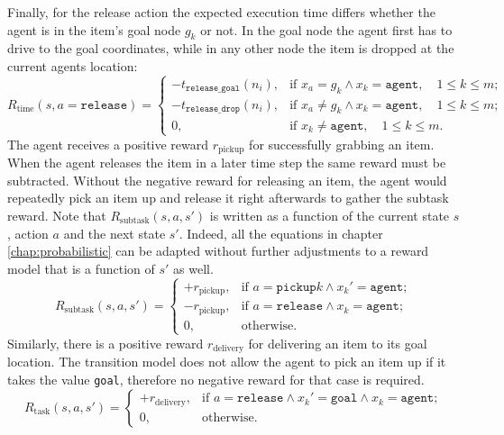 Finally, for the release action the expected execution time differs whether the agent is in the item's goal node $g_k$ or not. In the goal node the agent first has to drive to the goal coordinates, while in any other node the item is dropped at the current agents location: 
\begin{equation}
     R_\text{time}(s, a=\texttt{release}) = \begin{cases}
    -t_\texttt{release\_goal}(n_i), & \text{if }x_a=g_k \land x_k=\texttt{agent}, \quad 1 \leq k \leq m; \\
    -t_\texttt{release\_drop}(n_i), & \text{if }x_a\neq g_k \land x_k=\texttt{agent}, \quad 1 \leq k \leq m;\\
    0, & \text{if }x_k \neq \texttt{agent}, \quad 1 \leq k \leq m.
    \end{cases}
\end{equation}
The agent receives a positive reward $r_\text{pickup}$ for successfully grabbing an item. When the agent releases the item in a later time step the same reward must be subtracted. Without the negative reward for releasing an item, the agent would repeatedly pick an item up and release it right afterwards to gather the subtask reward. Note that $R_\text{subtask}(s,a,s')$ is written as a function of the current state $s$, action $a$ and the next state $s'$. Indeed, all the equations in chapter \ref{chap:probabilistic} can be adapted without further adjustments to a reward model that is a function of $s'$ as well. 
\begin{equation}
    R_\text{subtask}(s,a,s') = \begin{cases}
    +r_\text{pickup}, & \text{if }a=\texttt{pickup}k \land x_k'=\texttt{agent};\\
    -r_\text{pickup}, & \text{if }a=\texttt{release}\land x_k=\texttt{agent};\\
    0, & \text{otherwise}.\end{cases}
\end{equation}
Similarly, there is a positive reward $r_\text{delivery}$ for delivering an item to its goal location. The transition model does not allow the agent to pick an item up if it takes the value \texttt{goal}, therefore no negative reward for that case is required. 
\begin{equation}
    R_\text{task}(s,a,s') = \begin{cases} + r_\text{delivery}, & \text{if }a=\texttt{release}\land x_k'=\texttt{goal}\land x_k=\texttt{agent};\\
    0, & \text{otherwise}.
    \end{cases}
\end{equation}
